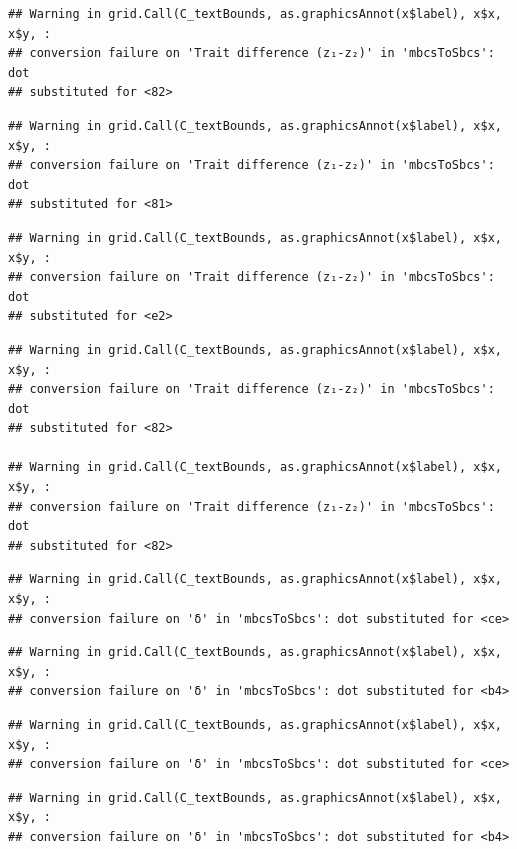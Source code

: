 \documentclass[]{article}
\begin{document}
\begin{verbatim}
## Warning in grid.Call(C_textBounds, as.graphicsAnnot(x$label), x$x, x$y, :
## conversion failure on 'Trait difference (z₁-z₂)' in 'mbcsToSbcs': dot
## substituted for <82>
\end{verbatim}

\begin{verbatim}
## Warning in grid.Call(C_textBounds, as.graphicsAnnot(x$label), x$x, x$y, :
## conversion failure on 'Trait difference (z₁-z₂)' in 'mbcsToSbcs': dot
## substituted for <81>
\end{verbatim}

\begin{verbatim}
## Warning in grid.Call(C_textBounds, as.graphicsAnnot(x$label), x$x, x$y, :
## conversion failure on 'Trait difference (z₁-z₂)' in 'mbcsToSbcs': dot
## substituted for <e2>
\end{verbatim}

\begin{verbatim}
## Warning in grid.Call(C_textBounds, as.graphicsAnnot(x$label), x$x, x$y, :
## conversion failure on 'Trait difference (z₁-z₂)' in 'mbcsToSbcs': dot
## substituted for <82>

## Warning in grid.Call(C_textBounds, as.graphicsAnnot(x$label), x$x, x$y, :
## conversion failure on 'Trait difference (z₁-z₂)' in 'mbcsToSbcs': dot
## substituted for <82>
\end{verbatim}

\begin{verbatim}
## Warning in grid.Call(C_textBounds, as.graphicsAnnot(x$label), x$x, x$y, :
## conversion failure on 'δ' in 'mbcsToSbcs': dot substituted for <ce>
\end{verbatim}

\begin{verbatim}
## Warning in grid.Call(C_textBounds, as.graphicsAnnot(x$label), x$x, x$y, :
## conversion failure on 'δ' in 'mbcsToSbcs': dot substituted for <b4>
\end{verbatim}

\begin{verbatim}
## Warning in grid.Call(C_textBounds, as.graphicsAnnot(x$label), x$x, x$y, :
## conversion failure on 'δ' in 'mbcsToSbcs': dot substituted for <ce>
\end{verbatim}

\begin{verbatim}
## Warning in grid.Call(C_textBounds, as.graphicsAnnot(x$label), x$x, x$y, :
## conversion failure on 'δ' in 'mbcsToSbcs': dot substituted for <b4>
\end{verbatim}
\end{document}
